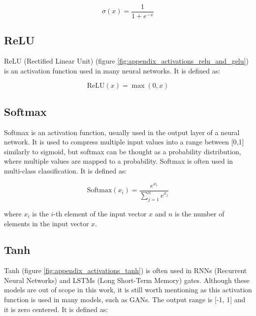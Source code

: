 \begin{equation*}
    \sigma(x) = \frac{1}{1 + e^{-x}}
\end{equation*}









\subsection*{ReLU}

ReLU (Rectified Linear Unit) (figure \ref{fig:appendix_activations_relu_and_gelu}) is an activation function used in many neural networks. It is defined as:

\begin{equation*}
    \text{ReLU}(x) = \max(0, x)
\end{equation*}








\subsection*{Softmax}

Softmax is an activation function, usually used in the output layer of a neural network. It is used to compress multiple input values into a range between [0,1] similarly to sigmoid, but softmax can be thought as a probability distribution, where multiple values are mapped to a probability. Softmax is often used in multi-class classification. It is defined as:

\begin{equation*}
    \text{Softmax}(x_i) = \frac{e^{x_i}}{\sum_{j=1}^{n} e^{x_j}}
\end{equation*}

where $x_i$ is the $i$-th element of the input vector $x$ and $n$ is the number of elements in the input vector $x$.






\subsection*{Tanh}

Tanh (figure \ref{fig:appendix_activations_tanh}) is often used in RNNs (Recurrent Neural Networks) and LSTMs (Long Short-Term Memory) gates. Although these models are out of scope in this work, it is still worth mentioning as this activation function is used in many models, such as GANs. The output range is [-1, 1] and it is zero centered. It is defined as:

